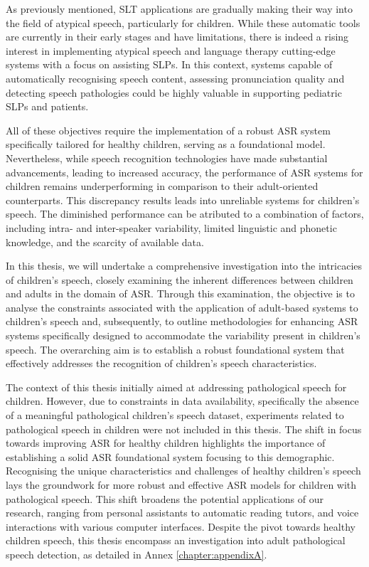 As previously mentioned, \ac{SLT} applications are gradually making their way into the field of atypical speech, particularly for children. While these automatic tools are currently in their early stages and have limitations, there is indeed a rising interest in implementing atypical speech and language therapy cutting-edge systems with a focus on assisting \acp{SLP}. In this context, systems capable of automatically recognising speech content, assessing pronunciation quality and detecting speech pathologies could be highly valuable in supporting pediatric \acp{SLP} and patients.

All of these objectives require the implementation of a robust \ac{ASR} system specifically tailored for healthy children, serving as a foundational model. Nevertheless, while speech recognition technologies have made substantial advancements, leading to increased accuracy, the performance of \ac{ASR} systems for children remains underperforming in comparison to their adult-oriented counterparts. This discrepancy results leads into unreliable systems for children's speech. The diminished performance can be atributed to a combination of factors, including intra- and inter-speaker variability, limited linguistic and phonetic knowledge, and the scarcity of available data.

In this thesis, we will undertake a comprehensive investigation into the intricacies of children's speech, closely examining the inherent differences between children and adults in the domain of \ac{ASR}. Through this examination, the objective is to analyse the constraints associated with the application of adult-based systems to children's speech and, subsequently, to outline methodologies for enhancing \ac{ASR} systems specifically designed to accommodate the variability present in children's speech. The overarching aim is to establish a robust foundational system that effectively addresses the recognition of children's speech characteristics.

The context of this thesis initially aimed at addressing pathological speech for children. However, due to constraints in data availability, specifically the absence of a meaningful pathological children's speech dataset, experiments related to pathological speech in children were not included in this thesis. 
The shift in focus towards improving \ac{ASR} for healthy children highlights the importance of establishing a solid \ac{ASR} foundational system focusing to this demographic. Recognising the unique characteristics and challenges of healthy children's speech lays the groundwork for more robust and effective \ac{ASR} models for children with pathological speech. This shift broadens the potential applications of our research, ranging from personal assistants to automatic reading tutors, and voice interactions with various computer interfaces. Despite the pivot towards healthy children speech, this thesis encompass an investigation into adult pathological speech detection, as detailed in Annex \ref{chapter:appendixA}.


